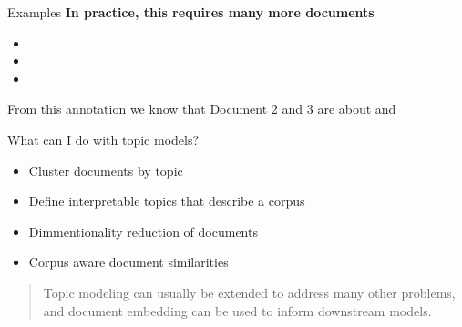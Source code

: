 \documentclass[10pt]{beamer}
\begin{document}
\begin{frame}{Examples}
{\bf In practice, this requires many more documents}

  \begin{multicols}{2}


    \vspace{.25em}


    \vspace{.25em}


    \columnbreak

    \begin{itemize}
    \item {}
    \item {}
    \item {}
    \end{itemize}

    \vspace{1em}

    From this annotation we know that Document 2 and 3 are about  and 
  \end{multicols}

\end{frame}

\begin{frame}{What can I do with topic models?}
  \begin{itemize}
  \item Cluster documents by topic
  \item Define interpretable topics that describe a corpus
  \item Dimmentionality reduction of documents
  \item Corpus aware document similarities
  \end{itemize}

  \begin{quote}
    Topic modeling can usually be extended to address many other problems, and document embedding can be used to inform downstream models.
  \end{quote}
\end{frame}
\end{document}
